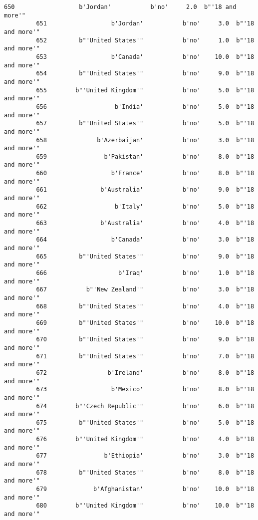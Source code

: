 \documentclass[11pt]{article}
\begin{document}
\begin{Verbatim}[commandchars=\\\{\}]
         650                  b'Jordan'           b'no'     2.0  b"'18 and more'"   
         651                  b'Jordan'           b'no'     3.0  b"'18 and more'"   
         652         b"'United States'"           b'no'     1.0  b"'18 and more'"   
         653                  b'Canada'           b'no'    10.0  b"'18 and more'"   
         654         b"'United States'"           b'no'     9.0  b"'18 and more'"   
         655        b"'United Kingdom'"           b'no'     5.0  b"'18 and more'"   
         656                   b'India'           b'no'     5.0  b"'18 and more'"   
         657         b"'United States'"           b'no'     5.0  b"'18 and more'"   
         658              b'Azerbaijan'           b'no'     3.0  b"'18 and more'"   
         659                b'Pakistan'           b'no'     8.0  b"'18 and more'"   
         660                  b'France'           b'no'     8.0  b"'18 and more'"   
         661               b'Australia'           b'no'     9.0  b"'18 and more'"   
         662                   b'Italy'           b'no'     5.0  b"'18 and more'"   
         663               b'Australia'           b'no'     4.0  b"'18 and more'"   
         664                  b'Canada'           b'no'     3.0  b"'18 and more'"   
         665         b"'United States'"           b'no'     9.0  b"'18 and more'"   
         666                    b'Iraq'           b'no'     1.0  b"'18 and more'"   
         667           b"'New Zealand'"           b'no'     3.0  b"'18 and more'"   
         668         b"'United States'"           b'no'     4.0  b"'18 and more'"   
         669         b"'United States'"           b'no'    10.0  b"'18 and more'"   
         670         b"'United States'"           b'no'     9.0  b"'18 and more'"   
         671         b"'United States'"           b'no'     7.0  b"'18 and more'"   
         672                 b'Ireland'           b'no'     8.0  b"'18 and more'"   
         673                  b'Mexico'           b'no'     8.0  b"'18 and more'"   
         674        b"'Czech Republic'"           b'no'     6.0  b"'18 and more'"   
         675         b"'United States'"           b'no'     5.0  b"'18 and more'"   
         676        b"'United Kingdom'"           b'no'     4.0  b"'18 and more'"   
         677                b'Ethiopia'           b'no'     3.0  b"'18 and more'"   
         678         b"'United States'"           b'no'     8.0  b"'18 and more'"   
         679             b'Afghanistan'           b'no'    10.0  b"'18 and more'"   
         680        b"'United Kingdom'"           b'no'    10.0  b"'18 and more'"   

\end{Verbatim}
\end{document}
